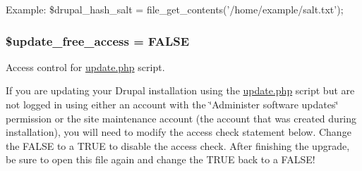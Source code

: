 Example: \$drupal\_\-hash\_\-salt = file\_\-get\_\-contents('/home/example/salt.txt'); \hypertarget{settings_8php_afa06f20a6b90dec9a2573e779cd10b44}{
\subsubsection[{\$update\_\-free\_\-access}]{\setlength{\rightskip}{0pt plus 5cm}\$update\_\-free\_\-access = FALSE}}
\label{settings_8php_afa06f20a6b90dec9a2573e779cd10b44}
Access control for \hyperlink{update_8php}{update.php} script.

If you are updating your Drupal installation using the \hyperlink{update_8php}{update.php} script but are not logged in using either an account with the \char`\"{}Administer software
 updates\char`\"{} permission or the site maintenance account (the account that was created during installation), you will need to modify the access check statement below. Change the FALSE to a TRUE to disable the access check. After finishing the upgrade, be sure to open this file again and change the TRUE back to a FALSE! 